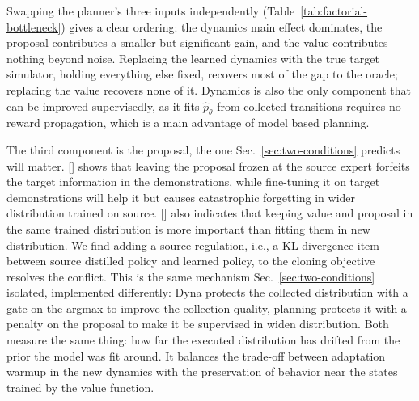 \documentclass{article} %
\begin{document}
Swapping the planner's three inputs independently (Table~\ref{tab:factorial-bottleneck}) gives a clear ordering: the dynamics main effect dominates, the proposal contributes a smaller but significant gain, and the value contributes nothing beyond noise. Replacing the learned dynamics with the true target simulator, holding everything else fixed, recovers most of the gap to the oracle; replacing the value recovers none of it. Dynamics is also the only component that can be improved supervisedly, as it fits $\hat p_\theta$ from collected transitions requires no reward propagation, which is a main advantage of model based planning.

The third component is the proposal, the one Sec.~\ref{sec:two-conditions} predicts will matter. [] shows that leaving the proposal frozen at the source expert forfeits the target information in the demonstrations, while fine-tuning it on target demonstrations will help it but causes catastrophic forgetting in wider distribution trained on source. [] also indicates that keeping value and proposal in the same trained distribution is more important than fitting them in new distribution. We find adding a source regulation, i.e., a KL divergence item between source distilled policy and learned policy, to the cloning objective resolves the conflict. This is the same mechanism Sec.~\ref{sec:two-conditions} isolated, implemented differently: Dyna protects the collected distribution with a gate on the argmax to improve the collection quality, planning protects it with a penalty on the proposal to make it be supervised in widen distribution. Both measure the same thing: how far the executed distribution has drifted from the prior the model was fit around. It balances the trade-off between adaptation warmup in the new dynamics with the preservation of behavior near the states trained by the value function.
\end{document}
